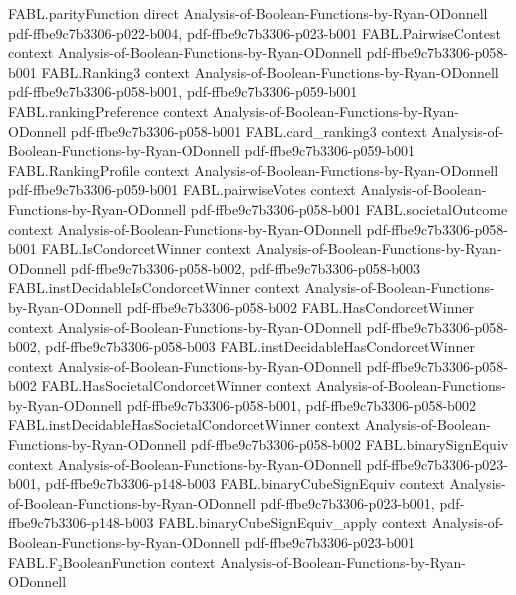 \begin{theorem}
\proofstep
  {FABL.parityFunction}
  {direct}
  {Analysis-of-Boolean-Functions-by-Ryan-ODonnell}
  {pdf-ffbe9c7b3306-p022-b004,
    pdf-ffbe9c7b3306-p023-b001}
\proofstep
  {FABL.PairwiseContest}
  {context}
  {Analysis-of-Boolean-Functions-by-Ryan-ODonnell}
  {pdf-ffbe9c7b3306-p058-b001}
\proofstep
  {FABL.Ranking3}
  {context}
  {Analysis-of-Boolean-Functions-by-Ryan-ODonnell}
  {pdf-ffbe9c7b3306-p058-b001,
    pdf-ffbe9c7b3306-p059-b001}
\proofstep
  {FABL.rankingPreference}
  {context}
  {Analysis-of-Boolean-Functions-by-Ryan-ODonnell}
  {pdf-ffbe9c7b3306-p058-b001}
\proofstep
  {FABL.card_ranking3}
  {context}
  {Analysis-of-Boolean-Functions-by-Ryan-ODonnell}
  {pdf-ffbe9c7b3306-p059-b001}
\proofstep
  {FABL.RankingProfile}
  {context}
  {Analysis-of-Boolean-Functions-by-Ryan-ODonnell}
  {pdf-ffbe9c7b3306-p059-b001}
\proofstep
  {FABL.pairwiseVotes}
  {context}
  {Analysis-of-Boolean-Functions-by-Ryan-ODonnell}
  {pdf-ffbe9c7b3306-p058-b001}
\proofstep
  {FABL.societalOutcome}
  {context}
  {Analysis-of-Boolean-Functions-by-Ryan-ODonnell}
  {pdf-ffbe9c7b3306-p058-b001}
\proofstep
  {FABL.IsCondorcetWinner}
  {context}
  {Analysis-of-Boolean-Functions-by-Ryan-ODonnell}
  {pdf-ffbe9c7b3306-p058-b002,
    pdf-ffbe9c7b3306-p058-b003}
\proofstep
  {FABL.instDecidableIsCondorcetWinner}
  {context}
  {Analysis-of-Boolean-Functions-by-Ryan-ODonnell}
  {pdf-ffbe9c7b3306-p058-b002}
\proofstep
  {FABL.HasCondorcetWinner}
  {context}
  {Analysis-of-Boolean-Functions-by-Ryan-ODonnell}
  {pdf-ffbe9c7b3306-p058-b002,
    pdf-ffbe9c7b3306-p058-b003}
\proofstep
  {FABL.instDecidableHasCondorcetWinner}
  {context}
  {Analysis-of-Boolean-Functions-by-Ryan-ODonnell}
  {pdf-ffbe9c7b3306-p058-b002}
\proofstep
  {FABL.HasSocietalCondorcetWinner}
  {context}
  {Analysis-of-Boolean-Functions-by-Ryan-ODonnell}
  {pdf-ffbe9c7b3306-p058-b001,
    pdf-ffbe9c7b3306-p058-b002}
\proofstep
  {FABL.instDecidableHasSocietalCondorcetWinner}
  {context}
  {Analysis-of-Boolean-Functions-by-Ryan-ODonnell}
  {pdf-ffbe9c7b3306-p058-b002}
\proofstep
  {FABL.binarySignEquiv}
  {context}
  {Analysis-of-Boolean-Functions-by-Ryan-ODonnell}
  {pdf-ffbe9c7b3306-p023-b001,
    pdf-ffbe9c7b3306-p148-b003}
\proofstep
  {FABL.binaryCubeSignEquiv}
  {context}
  {Analysis-of-Boolean-Functions-by-Ryan-ODonnell}
  {pdf-ffbe9c7b3306-p023-b001,
    pdf-ffbe9c7b3306-p148-b003}
\proofstep
  {FABL.binaryCubeSignEquiv_apply}
  {context}
  {Analysis-of-Boolean-Functions-by-Ryan-ODonnell}
  {pdf-ffbe9c7b3306-p023-b001}
\proofstep
  {FABL.F₂BooleanFunction}
  {context}
  {Analysis-of-Boolean-Functions-by-Ryan-ODonnell}

\end{theorem}
